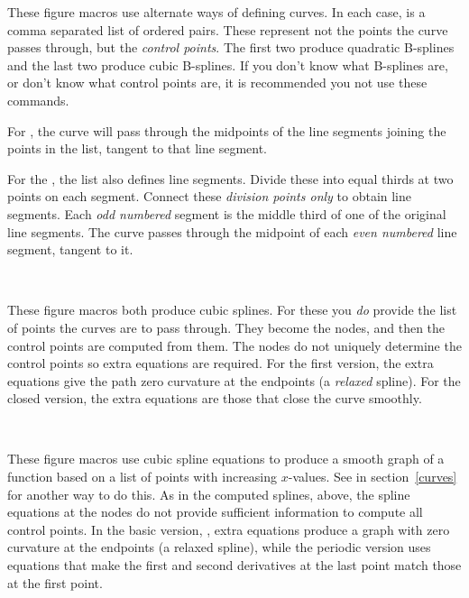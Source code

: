 \documentclass[letterpaper]{article}
\begin{document}
These figure macros use alternate ways of defining curves. In each case,
 is a comma separated list of ordered pairs. These represent
not the points the curve passes through, but the \emph{control points}.
The first two produce quadratic B-splines and the last two produce cubic
B-splines. If you don't know what B-splines are, or don't know what
control points are, it is recommended you not use these commands.

For , the curve will pass through the midpoints of the line
segments joining the points in the list, tangent to that line segment.

For the , the list also defines line segments. Divide these
into equal thirds at two points on each segment. Connect these
\emph{division points only} to obtain line segments. Each \emph{odd
numbered} segment is the middle third of one of the original line
segments. The  curve passes through the midpoint of each
\emph{even numbered} line segment, tangent to it.

\begin{cd}
\\
%
%
%
\end{cd}

These figure macros both produce cubic splines. For these you \emph{do}
provide the list of points the curves are to pass through. They become
the nodes, and then the control points are computed from them. The nodes
do not uniquely determine the control points so extra equations are
required. For the first version, the extra equations give the path zero
curvature at the endpoints (a \emph{relaxed} spline). For the closed
version, the extra equations are those that close the curve smoothly.

\begin{cd}
\\
%
%
%
\end{cd}

These figure macros use cubic spline equations to produce a smooth graph
of a function based on a list of points with increasing $x$-values. See
 in section~\ref{curves} for another way to do this. As in
the computed splines, above, the spline equations at the nodes do not
provide sufficient information to compute all control points. In the
basic version, , extra equations produce a graph with zero
curvature at the endpoints (a relaxed spline), while the periodic
version uses equations that make the first and second derivatives at the
last point match those at the first point.
\end{document}
